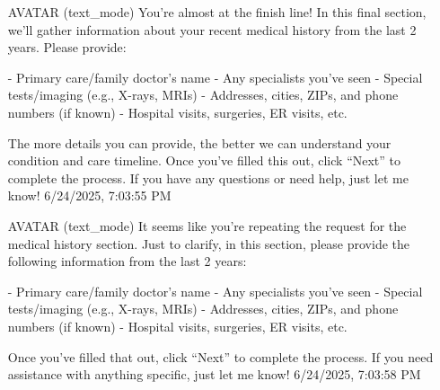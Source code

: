 \documentclass[a4paper,12pt]{article}
\begin{document}
\begin{enumerate}
    \item[AVATAR (text_mode)] You're almost at the finish line! In this final section, we’ll gather information about your recent medical history from the last 2 years. Please provide:

- Primary care/family doctor’s name  
- Any specialists you've seen  
- Special tests/imaging (e.g., X-rays, MRIs)  
- Addresses, cities, ZIPs, and phone numbers (if known)  
- Hospital visits, surgeries, ER visits, etc.  

The more details you can provide, the better we can understand your condition and care timeline. Once you’ve filled this out, click “Next” to complete the process. If you have any questions or need help, just let me know! \hfill 6/24/2025, 7:03:55 PM


    \item[AVATAR (text_mode)] It seems like you're repeating the request for the medical history section. Just to clarify, in this section, please provide the following information from the last 2 years:

- Primary care/family doctor’s name  
- Any specialists you've seen  
- Special tests/imaging (e.g., X-rays, MRIs)  
- Addresses, cities, ZIPs, and phone numbers (if known)  
- Hospital visits, surgeries, ER visits, etc.

Once you've filled that out, click “Next” to complete the process. If you need assistance with anything specific, just let me know! \hfill 6/24/2025, 7:03:58 PM

\end{enumerate}
\end{document}
